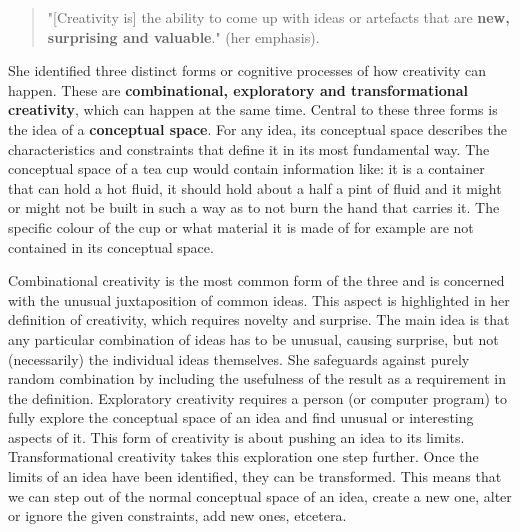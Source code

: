 \begin{quote}
"[Creativity is] the ability to come up with ideas or artefacts that are \textbf{new, surprising and valuable}." \citep{Boden2003} (her emphasis).
\end{quote}

She identified three distinct forms or cognitive processes of how creativity can happen. These are \textbf{combinational, exploratory and transformational creativity}, which can happen at the same time. Central to these three forms is the idea of a \textbf{conceptual space}. For any idea, its conceptual space describes the characteristics and constraints that define it in its most fundamental way. The conceptual space of a tea cup would contain information like: it is a container that can hold a hot fluid, it should hold about a half a pint of fluid and it might or might not be built in such a way as to not burn the hand that carries it. The specific colour of the cup or what material it is made of for example are not contained in its conceptual space.

Combinational creativity is the most common form of the three and is concerned with the unusual juxtaposition of common ideas. This aspect is highlighted in her definition of creativity, which requires novelty and surprise. The main idea is that any particular combination of ideas has to be unusual, causing surprise, but not (necessarily) the individual ideas themselves. She safeguards against purely random combination by including the usefulness of the result as a requirement in the definition. Exploratory creativity requires a person (or computer program) to fully explore the conceptual space of an idea and find unusual or interesting aspects of it. This form of creativity is about pushing an idea to its limits. Transformational creativity takes this exploration one step further. Once the limits of an idea have been identified, they can be transformed. This means that we can step out of the normal conceptual space of an idea, create a new one, alter or ignore the given constraints, add new ones, etcetera.

